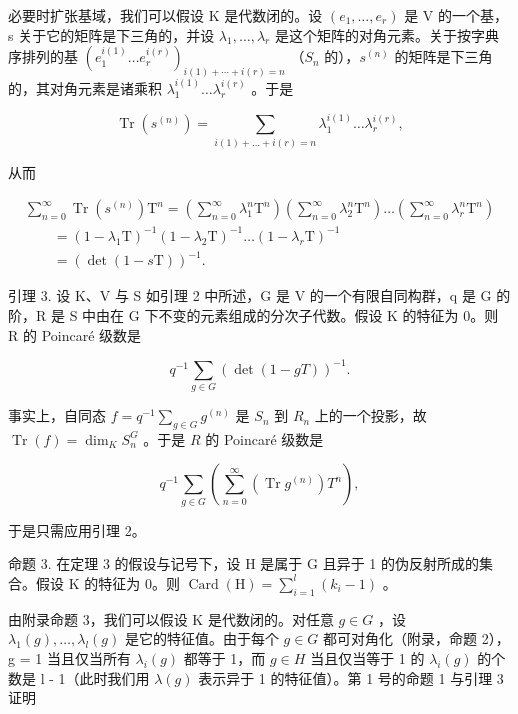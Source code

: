 必要时扩张基域，我们可以假设 K 是代数闭的。设 \((e_{1},\ldots,e_{r})\) 是 V 的一个基，s 关于它的矩阵是下三角的，并设 \(\lambda_{1},\ldots,\lambda_{r}\) 是这个矩阵的对角元素。关于按字典序排列的基 \((e_{1}^{i(1)}\ldots e_{r}^{i(r)})_{i(1)+\cdots+i(r)=n}\) （\(S_{n}\) 的），\(s^{(n)}\) 的矩阵是下三角的，其对角元素是诸乘积 \(\lambda_{1}^{i(1)}\ldots\lambda_{r}^{i(r)}\) 。于是

\[
\operatorname{Tr} \left(s ^ {(n)}\right) = \sum_ {i (1) + \dots + i (r) = n} \lambda_ {1} ^ {i (1)} \dots \lambda_ {r} ^ {i (r)},
\]

从而

\[
\begin{array}{l} \sum_ {n = 0} ^ {\infty} \operatorname{Tr} (s ^ {(n)}) \mathrm{T} ^ {n} = \left(\sum_ {n = 0} ^ {\infty} \lambda_ {1} ^ {n} \mathrm{T} ^ {n}\right) \left(\sum_ {n = 0} ^ {\infty} \lambda_ {2} ^ {n} \mathrm{T} ^ {n}\right) \ldots \left(\sum_ {n = 0} ^ {\infty} \lambda_ {r} ^ {n} \mathrm{T} ^ {n}\right) \\ \qquad = (1 - \lambda_ {1} \mathrm{T}) ^ {- 1} (1 - \lambda_ {2} \mathrm{T}) ^ {- 1} \ldots (1 - \lambda_ {r} \mathrm{T}) ^ {- 1} \\ \qquad = (\det (1 - s \mathrm{T})) ^ {- 1}. \end{array}
\]

引理 3. 设 K、V 与 S 如引理 2 中所述，G 是 V 的一个有限自同构群，q 是 G 的阶，R 是 S 中由在 G 下不变的元素组成的分次子代数。假设 K 的特征为 0。则 R 的 Poincaré 级数是

\[
q ^ {- 1} \sum_ {g \in G} (\det (1 - g T)) ^ {- 1}.
\]

事实上，自同态 \(f = q^{-1} \sum_{g \in G} g^{(n)}\) 是 \(S_n\) 到 \(R_n\) 上的一个投影，故 \(\operatorname{Tr}(f) = \dim_K S_n^G\) 。于是 \(R\) 的 Poincaré 级数是

\[
q ^ {- 1} \sum_ {g \in G} \left(\sum_ {n = 0} ^ {\infty} (\operatorname{Tr} g ^ {(n)}) T ^ {n}\right),
\]

于是只需应用引理 2。

命题 3. 在定理 3 的假设与记号下，设 H 是属于 G 且异于 1 的伪反射所成的集合。假设 K 的特征为 0。则 \(\operatorname{Card}(\mathrm{H}) = \sum_{i=1}^{l}(k_i - 1)\) 。

由附录命题 3，我们可以假设 K 是代数闭的。对任意 \(g \in G\) ，设 \(\lambda_{1}(g), \ldots, \lambda_{l}(g)\) 是它的特征值。由于每个 \(g \in G\) 都可对角化（附录，命题 2），g = 1 当且仅当所有 \(\lambda_{i}(g)\) 都等于 1，而 \(g \in H\) 当且仅当等于 1 的 \(\lambda_{i}(g)\) 的个数是 l - 1（此时我们用 \(\lambda(g)\) 表示异于 1 的特征值）。第 1 号的命题 1 与引理 3 证明

